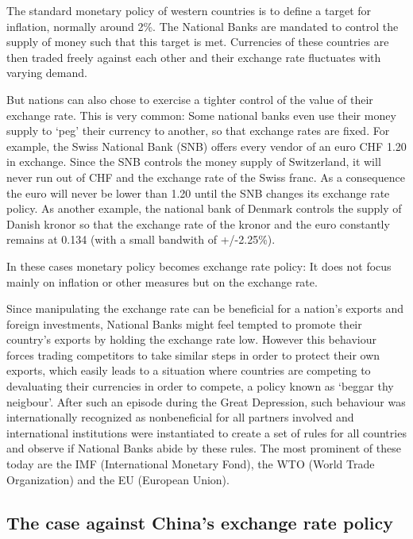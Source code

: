 \documentclass[11pt]{article}
\begin{document}
The standard monetary policy of western countries is to define a target for inflation, normally around 2\%. The National Banks are mandated to control the supply of money such that this target is met. Currencies of these countries are then traded freely against each other and their exchange rate fluctuates with varying demand. 

But nations can also chose to exercise a tighter control of the value of their 
exchange rate. 
This is very common: Some national banks even use their money 
supply to `peg' their currency to another, so that exchange rates are 
fixed.  For example, the Swiss National Bank (SNB) offers every vendor 
of an euro CHF 1.20 in exchange.  Since the SNB controls the money 
supply of Switzerland, it will never run out of CHF and the exchange 
rate of the Swiss franc. As a consequence the euro will never be lower 
than 1.20 until the SNB changes its exchange rate policy.  As another 
example, the national bank of Denmark controls the supply of Danish 
kronor so that the exchange rate of the kronor and the euro constantly 
remains at 0.134 (with a small bandwith of +/-2.25\%).

In these cases monetary policy becomes exchange rate policy: It does not focus mainly on inflation or other measures but on the exchange rate.

Since manipulating the 
exchange rate can be beneficial for a nation's exports and 
foreign investments, National Banks might feel tempted to promote their country's exports by holding the exchange rate low. However this behaviour forces trading competitors 
to take similar steps in order to protect their own exports, which 
easily leads to a situation where countries are competing to devaluating 
their currencies in order to compete, a policy known as `beggar thy neigbour'. After such an episode during the Great Depression, such behaviour was internationally recognized as nonbeneficial for all partners involved and international 
institutions were instantiated to create a set of rules for all countries and observe if National Banks abide by these rules. The most prominent of these today are the IMF (International 
Monetary Fond), the WTO (World Trade Organization) and the EU (European 
Union).



\subsection{The case against China's exchange rate policy}
\end{document}
